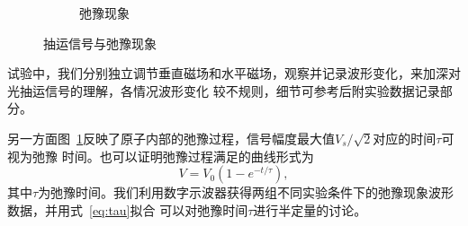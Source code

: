 \documentclass[11pt,a4paper]{article}
\begin{document}
\begin{spacing}{1.3}
\begin{CJK*}{UTF8}{gbsn}
\begin{figure}[h!]
\begin{subfigure}{0.50\textwidth}
\caption{弛豫现象}
\label{fig:fangb}
\end{subfigure}
\caption{抽运信号与弛豫现象}\label{fig:fang}
\end{figure}
试验中，我们分别独立调节垂直磁场和水平磁场，观察并记录波形变化，来加深对光抽运信号的理解，各情况波形变化
较不规则，细节可参考后附实验数据记录部分。\par 
另一方面图~\ref{fig:fangb}反映了原子内部的弛豫过程，信号幅度最大值$V_s/\sqrt{2}$对应的时间$\tau$可视为弛豫
时间。也可以证明弛豫过程满足的曲线形式为
\begin{equation}
V=V_0(1-e^{-t/\tau}),\label{eq:tau}
\end{equation}
其中$\tau$为弛豫时间。我们利用数字示波器获得两组不同实验条件下的弛豫现象波形数据，并用式~\eqref{eq:tau}拟合
可以对弛豫时间$\tau$进行半定量的讨论。


\end{CJK*}
\end{spacing}
\end{document}
